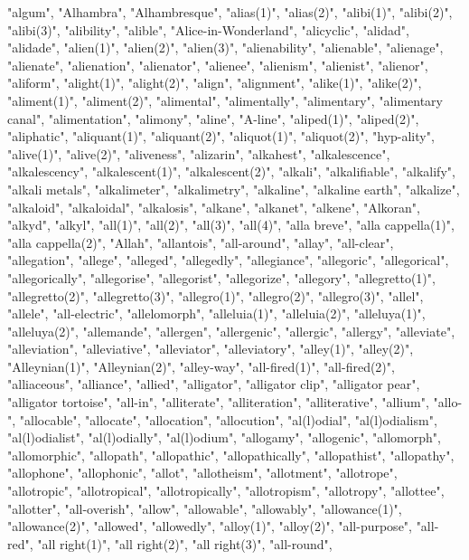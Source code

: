 "algum",
"Alhambra",
"Alhambresque",
"alias(1)",
"alias(2)",
"alibi(1)",
"alibi(2)",
"alibi(3)",
"alibility",
"alible",
"Alice-in-Wonderland",
"alicyclic",
"alidad",
"alidade",
"alien(1)",
"alien(2)",
"alien(3)",
"alienability",
"alienable",
"alienage",
"alienate",
"alienation",
"alienator",
"alienee",
"alienism",
"alienist",
"alienor",
"aliform",
"alight(1)",
"alight(2)",
"align",
"alignment",
"alike(1)",
"alike(2)",
"aliment(1)",
"aliment(2)",
"alimental",
"alimentally",
"alimentary",
"alimentary canal",
"alimentation",
"alimony",
"aline",
"A-line",
"aliped(1)",
"aliped(2)",
"aliphatic",
"aliquant(1)",
"aliquant(2)",
"aliquot(1)",
"aliquot(2)",
"hyp-ality",
"alive(1)",
"alive(2)",
"aliveness",
"alizarin",
"alkahest",
"alkalescence",
"alkalescency",
"alkalescent(1)",
"alkalescent(2)",
"alkali",
"alkalifiable",
"alkalify",
"alkali metals",
"alkalimeter",
"alkalimetry",
"alkaline",
"alkaline earth",
"alkalize",
"alkaloid",
"alkaloidal",
"alkalosis",
"alkane",
"alkanet",
"alkene",
"Alkoran",
"alkyd",
"alkyl",
"all(1)",
"all(2)",
"all(3)",
"all(4)",
"alla breve",
"alla cappella(1)",
"alla cappella(2)",
"Allah",
"allantois",
"all-around",
"allay",
"all-clear",
"allegation",
"allege",
"alleged",
"allegedly",
"allegiance",
"allegoric",
"allegorical",
"allegorically",
"allegorise",
"allegorist",
"allegorize",
"allegory",
"allegretto(1)",
"allegretto(2)",
"allegretto(3)",
"allegro(1)",
"allegro(2)",
"allegro(3)",
"allel",
"allele",
"all-electric",
"allelomorph",
"alleluia(1)",
"alleluia(2)",
"alleluya(1)",
"alleluya(2)",
"allemande",
"allergen",
"allergenic",
"allergic",
"allergy",
"alleviate",
"alleviation",
"alleviative",
"alleviator",
"alleviatory",
"alley(1)",
"alley(2)",
"Alleynian(1)",
"Alleynian(2)",
"alley-way",
"all-fired(1)",
"all-fired(2)",
"alliaceous",
"alliance",
"allied",
"alligator",
"alligator clip",
"alligator pear",
"alligator tortoise",
"all-in",
"alliterate",
"alliteration",
"alliterative",
"allium",
"allo-",
"allocable",
"allocate",
"allocation",
"allocution",
"al(l)odial",
"al(l)odialism",
"al(l)odialist",
"al(l)odially",
"al(l)odium",
"allogamy",
"allogenic",
"allomorph",
"allomorphic",
"allopath",
"allopathic",
"allopathically",
"allopathist",
"allopathy",
"allophone",
"allophonic",
"allot",
"allotheism",
"allotment",
"allotrope",
"allotropic",
"allotropical",
"allotropically",
"allotropism",
"allotropy",
"allottee",
"allotter",
"all-overish",
"allow",
"allowable",
"allowably",
"allowance(1)",
"allowance(2)",
"allowed",
"allowedly",
"alloy(1)",
"alloy(2)",
"all-purpose",
"all-red",
"all right(1)",
"all right(2)",
"all right(3)",
"all-round",
